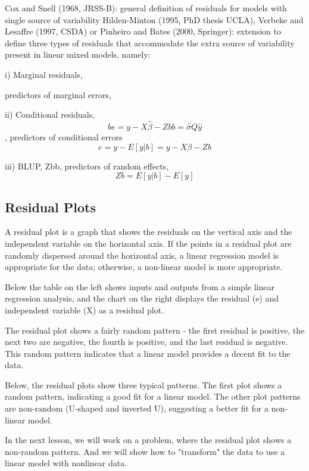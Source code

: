 \documentclass[12pt, a4paper]{report}
\theoremstyle{plain}
\theoremstyle{definition}
\theoremstyle{remark}
\begin{document}
	Cox and Snell (1968, JRSS-B): general definition of residuals for
	models with single source of variability
	Hilden-Minton (1995, PhD thesis UCLA), Verbeke and Lesaffre
	(1997, CSDA) or Pinheiro and Bates (2000, Springer): extension to
	define three types of residuals that accommodate the extra source of
	variability present in linear mixed models, namely:
	
	i) Marginal residuals, 
	
	predictors of marginal errors, 
	
	
	ii) Conditional residuals, 
	\[be = y − X\hat{\beta} − Zbb = \hat{\sigma}Q\hat{y}\] , predictors of
	conditional errors 
	\[e = y − E[y|b] = y − X\beta − Zb\]
	
	iii) BLUP, Zbb, predictors of random effects,
	\[ Zb = E[y|b] − E[y]\]
	
	\subsection{Residual Plots}
	A residual plot is a graph that shows the residuals on the vertical axis and the independent variable on the horizontal axis. If the points in a residual plot are randomly dispersed around the horizontal axis, a linear regression model is appropriate for the data; otherwise, a non-linear model is more appropriate.
	
	Below the table on the left shows inputs and outputs from a simple linear regression analysis, and the chart on the right displays the residual (e) and independent variable (X) as a residual plot.
	
	\newpage
	The residual plot shows a fairly random pattern - the first residual is positive, the next two are negative, the fourth is positive, and the last residual is negative. This random pattern indicates that a linear model provides a decent fit to the data.
	
	Below, the residual plots show three typical patterns. The first plot shows a random pattern, indicating a good fit for a linear model. The other plot patterns are non-random (U-shaped and inverted U), suggesting a better fit for a non-linear model.
	
	
	In the next lesson, we will work on a problem, where the residual plot shows a non-random pattern. And we will show how to "transform" the data to use a linear model with nonlinear data.
	
\end{document}
